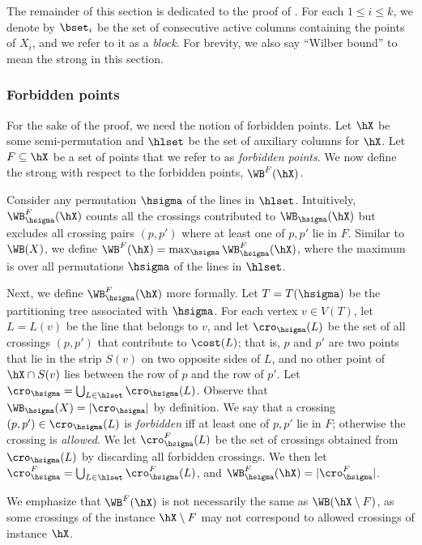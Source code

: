 \documentclass{toc}
\begin{document}
The remainder of this section is dedicated to the proof of .
%
For each $1\leq i\leq k$, we denote by $\bset_i$ be the set of consecutive active columns containing the points of $X_i$, and we refer to it as a \emph{block}. For brevity, we also say ``Wilber bound'' to mean the strong \WBone in this section.

%
%
%
%
\subsubsection{Forbidden points}
%
%
%
%
For the sake of the proof, we need the notion of forbidden points.
Let $\hX$ be some semi-permutation and $\hlset$ be the set of auxiliary columns for $\hX$.
Let $F\subseteq \hX$ be a set of points that we refer to as \emph{forbidden points}.
We now define the strong \WBone with respect to the forbidden points, $\WB^F(\hX)$.

Consider any permutation $\hsigma$ of the lines in $\hlset$. 
Intuitively, $\WB_{\hsigma}^F(\hX)$ counts all the crossings contributed to $\WB_{\hsigma}(\hX)$ but excludes all crossing pairs $(p,p')$ where at least one of $p,p'$ lie in $F$.
Similar to $\WB(X)$, we define $\WB^F(\hX) = \max_{\hsigma} \WB_{\hsigma}^F(\hX)$, where the maximum is over all permutations $\hsigma$ of the lines in $\hlset$.

Next, we define $\WB_{\hsigma}^F(\hX)$ more formally. 
Let $T=T(\hsigma)$ be the partitioning tree associated with $\hsigma$.
For each vertex $v \in V(T)$, let $L = L(v)$ be the line that belongs to $v$, and 
let $\cro_{\hsigma}(L)$ be the set of all crossings $(p,p')$ that contribute to $\cost(L)$; 
that is, $p$ and $p'$ are two points that lie in the strip $S(v)$ on two opposite sides of $L$, and no other point of $\hX\cap S(v)$ lies between the row of $p$ and the row of $p'$.
Let $\cro_{\hsigma} = \bigcup_{L\in \hlset}\cro_{\hsigma}(L)$.
Observe that $\WB_{\hsigma}(X) = |\cro_{\hsigma}|$ by definition.
We say that a crossing $(p,p')\in \cro_{\hsigma}(L)$ is \emph{forbidden} iff at least one of $p,p'$ lie in $F$; otherwise the crossing is \emph{allowed}. We let $\cro^F_{\hsigma}(L)$ be the set of crossings obtained from $\cro_{\hsigma}(L)$ by discarding all forbidden crossings. We then let $\cro^F_{\hsigma}=\bigcup_{L\in \hlset}\cro^F_{\hsigma}(L)$, and $\WB^F_{\hsigma}(\hX)=|\cro^F_{\hsigma}|$.
%
%
%
%

We emphasize that $\WB^F(\hX)$ is not necessarily the same as $\WB(\hX\setminus F)$, as some crossings of the instance $\hX\setminus F$ may not correspond to allowed crossings of instance $\hX$.
\end{document}

